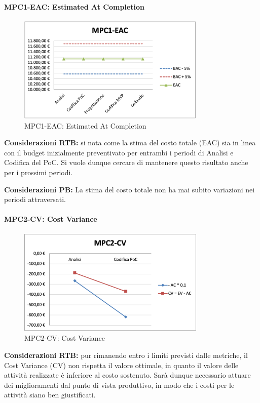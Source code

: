 \paragraph{MPC1-EAC: Estimated At Completion}
\begin{figure}[h!]
    \centering
    \includegraphics[width=0.8\textwidth]{images/MPC1-EAC.png}
    \caption{MPC1-EAC: Estimated At Completion}
\end{figure}
\noindent \textbf{Considerazioni RTB:} si nota come la stima del costo totale (EAC) sia in linea con il budget inizialmente preventivato per entrambi i periodi di Analisi e Codifica del PoC. Si vuole dunque cercare di mantenere questo risultato anche per i prossimi periodi.

\vspace{0.5cm}

\noindent \textbf{Considerazioni PB:} La stima del costo totale non ha mai subito variazioni nei periodi attraversati.

\newpage
\paragraph{MPC2-CV: Cost Variance}
\begin{figure}[h!] 
    \centering
    \includegraphics[width=0.8\textwidth]{images/MPC2-CV.png}
    \caption{MPC2-CV: Cost Variance}
\end{figure}
\noindent \textbf{Considerazioni RTB:} pur rimanendo entro i limiti previsti dalle metriche, il Cost Variance (CV) non rispetta il valore ottimale, in quanto il valore delle attività realizzate è inferiore al costo sostenuto. Sarà dunque necessario attuare dei miglioramenti dal punto di vista produttivo, in modo che i costi per le attività siano ben giustificati.

